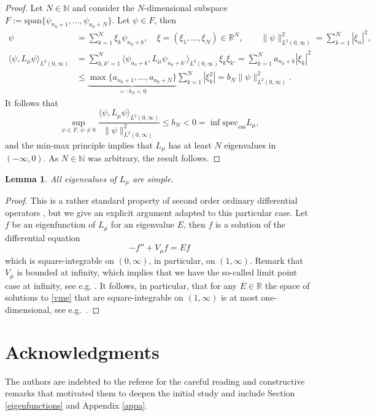 \documentclass[11pt,oneside,reqno,a4paper]{amsart}
\newcommand{\N}{\mathbb{N}}
\newcommand{\R}{\mathbb{R}}
\newcommand{\specess}{\mathrm{spec}_{\mathrm{ess}}}
\newtheorem{lemma}[theorem]{Lemma}
\theoremstyle{definition}
\begin{document}
\begin{proof}
Let $N\in \N$ and consider the $N$-dimensional subspace $F:=\mathrm{span}\{\psi_{n_0+1},\dots,\psi_{n_0+N}\}$. 
Let $\psi\in F$, then
\begin{align*}
\psi&=\sum_{k=1}^{N} \xi_k \psi_{n_0+k}, \quad \xi=(\xi_1,\dots,\xi_N)\in \R^N,\qquad
\|\psi\|^2_{L^2(0,\infty)}=\sum_{k=1}^{N} |\xi_n|^2,\\
 \langle\psi,L_\mu\psi\rangle_{L^2(0,\infty)}&=\sum_{k,k'=1}^{N} \langle\psi_{n_0+k}, L_\mu\psi_{n_0+k'}\rangle_{L^2(0,\infty)}\xi_k\xi_{k'}=\sum_{k=1}^{N} a_{n_0+k}|\xi_k|^2 
\\ 
&\le \underbrace{\max\{a_{n_0+1},\dots,a_{n_0+N}\}}_{=:b_N<0}
\sum_{k=1}^N |\xi^2_k|= b_N \|\psi\|^2_{L^2(0,\infty)}.
\end{align*}
It follows that
\[
\sup_{\psi\in F,\,\psi\ne 0}\dfrac{\langle \psi, L_\mu\psi\rangle_{L^2(0,\infty)}}{ \|\psi\|^2_{L^2(0,\infty)}}\le b_N<0=\inf\specess L_\mu,
\]
and the min-max principle implies that $L_\mu$ has at least $N$ eigenvalues in $(-\infty,0)$.
As $N\in\N$ was arbitrary, the result follows.
\end{proof}


\begin{lemma}
	All eigenvalues of $L_\mu$ are simple.
\end{lemma}

\begin{proof}
	This is a rather standard  property of second order ordinary differential operators \cite{weid}, but we give 
	an explicit argument adapted to this particular case.	Let $f$ be an eigenfunction of $L_\mu$ for an eigenvalue $E$, then $f$ is a solution of the differential equation
	\begin{equation}
		-f''+V_\mu f=E f \label{vme}
	\end{equation}
	which is square-integrable on $(0,\infty)$, in particular, on $(1,\infty)$. Remark that $V_\mu$ is bounded at infinity, which implies that we have the so-called limit point case at infinity, see e.g. \cite[Theorem 6.6]{weid}. It follows, in particular, that for any $E\in\R$ the space of solutions to \eqref{vme} 
	that are square-integrable on $(1,\infty)$ is at most one-dimensional, see e.g.~\cite[Theorem 5.6]{weid}.
\end{proof}










\section*{Acknowledgments}
The authors are indebted to the referee for the careful reading and constructive remarks that motivated them to deepen the initial study and include Section \ref{eigenfunctions} and Appendix \ref{appa}.
\end{document}
